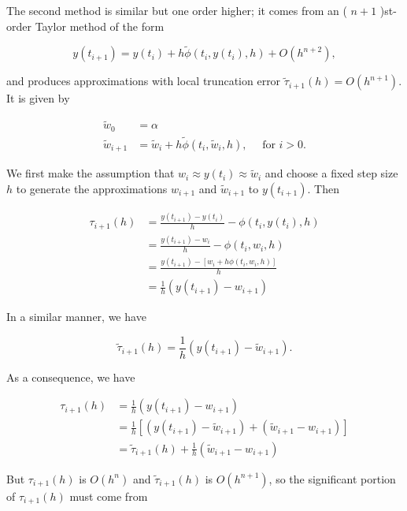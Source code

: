 The second method is similar but one order higher; it comes from an ( $n+1$ )st-order Taylor method of the form

$$
y\left(t_{i+1}\right)=y\left(t_{i}\right)+h \tilde{\phi}\left(t_{i}, y\left(t_{i}\right), h\right)+O\left(h^{n+2}\right),
$$

and produces approximations with local truncation error $\tilde{\tau}_{i+1}(h)=O\left(h^{n+1}\right)$. It is given by

$$
\begin{aligned}
\tilde{w}_{0} & =\alpha \\
\tilde{w}_{i+1} & =\tilde{w}_{i}+h \tilde{\phi}\left(t_{i}, \tilde{w}_{i}, h\right), \quad \text { for } i>0 .
\end{aligned}
$$

We first make the assumption that $w_{i} \approx y\left(t_{i}\right) \approx \tilde{w}_{i}$ and choose a fixed step size $h$ to generate the approximations $w_{i+1}$ and $\tilde{w}_{i+1}$ to $y\left(t_{i+1}\right)$. Then

$$
\begin{aligned}
\tau_{i+1}(h) & =\frac{y\left(t_{i+1}\right)-y\left(t_{i}\right)}{h}-\phi\left(t_{i}, y\left(t_{i}\right), h\right) \\
& =\frac{y\left(t_{i+1}\right)-w_{i}}{h}-\phi\left(t_{i}, w_{i}, h\right) \\
& =\frac{y\left(t_{i+1}\right)-\left[w_{i}+h \phi\left(t_{i}, w_{i}, h\right)\right]}{h} \\
& =\frac{1}{h}\left(y\left(t_{i+1}\right)-w_{i+1}\right)
\end{aligned}
$$

In a similar manner, we have

$$
\tilde{\tau}_{i+1}(h)=\frac{1}{h}\left(y\left(t_{i+1}\right)-\tilde{w}_{i+1}\right) .
$$

As a consequence, we have

$$
\begin{aligned}
\tau_{i+1}(h) & =\frac{1}{h}\left(y\left(t_{i+1}\right)-w_{i+1}\right) \\
& =\frac{1}{h}\left[\left(y\left(t_{i+1}\right)-\tilde{w}_{i+1}\right)+\left(\tilde{w}_{i+1}-w_{i+1}\right)\right] \\
& =\tilde{\tau}_{i+1}(h)+\frac{1}{h}\left(\tilde{w}_{i+1}-w_{i+1}\right)
\end{aligned}
$$

But $\tau_{i+1}(h)$ is $O\left(h^{n}\right)$ and $\tilde{\tau}_{i+1}(h)$ is $O\left(h^{n+1}\right)$, so the significant portion of $\tau_{i+1}(h)$ must come from

